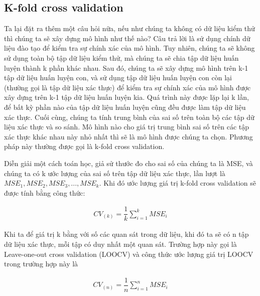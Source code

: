 \documentclass[
]{article}
\begin{document}
\hypertarget{k-fold-cross-validation}{%
\subsection{K-fold cross validation}\label{k-fold-cross-validation}}

Ta lại đặt ra thêm một câu hỏi nữa, nếu như chúng ta không có dữ liệu kiểm thử thì chúng ta sẽ xây dựng mô hình như thế nào? Câu trả lời là sử dụng chính dữ liệu đào tạo để kiểm tra sự chính xác của mô hình. Tuy nhiên, chúng ta sẽ không sử dụng toàn bộ tập dữ liệu kiểm thử, mà chúng ta sẽ chia tập dữ liệu huấn luyện thành k phần khác nhau. Sau đó, chúng ta sẽ xây dựng mô hình trên k-1 tập dữ liệu huấn luyện con, và sử dụng tập dữ liệu huấn luyện con còn lại (thường gọi là tập dữ liệu xác thực) để kiểm tra sự chính xác của mô hình được xây dựng trên k-1 tập dữ liệu huấn luyện kia. Quá trình này được lặp lại k lần, để bất kỳ phần nào của tập dữ liệu huấn luyện cũng đều được làm tập dữ liệu xác thực. Cuối cùng, chúng ta tính trung bình của sai số trên toàn bộ các tập dữ liệu xác thực và so sánh. Mô hình nào cho giá trị trung bình sai số trên các tập xác thực khác nhau này nhỏ nhất thì sẽ là mô hình được chúng ta chọn. Phương pháp này thường được gọi là k-fold cross validation.

Diễn giải một cách toán học, giả sử thước đo cho sai số của chúng ta là MSE, và chúng ta có k ước lượng của sai số trên tập dữ liệu xác thực, lần lượt là \(MSE_1, MSE_2, MSE_3, ... , MSE_k\). Khi đó ước lượng giá trị k-fold cross validation sẽ được tính bằng công thức:

\begin{align}
CV_{(k)} = \dfrac{1}{k} \sum\limits_{i=1}^{k} MSE_i
\end{align}

Khi ta để giá trị k bằng với số các quan sát trong dữ liệu, khi đó ta sẽ có n tập dữ liệu xác thực, mỗi tập có duy nhất một quan sát. Trường hợp này gọi là Leave-one-out cross validation (LOOCV) và công thức ước lượng giá trị LOOCV trong trường hợp này là

\begin{align}
CV_{(n)} = \dfrac{1}{n} \sum\limits_{i=1}^{n} MSE_i
\end{align}
\end{document}

